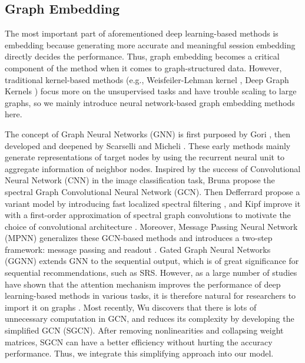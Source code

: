 \documentclass[conference]{IEEEtran}
\begin{document}
\subsection{Graph Embedding}
\noindent The most important part of aforementioned deep learning-based methods is embedding because generating more accurate and meaningful session embedding directly decides the performance. Thus, graph embedding becomes a critical component of the method when it comes to graph-structured data. However, traditional kernel-based methods (e.g., Weisfeiler-Lehman kernel \cite{shervashidze11}, Deep Graph Kernels \cite{Yanardag15}) focus more on the unsupervised tasks and have trouble scaling to large graphs, so we mainly introduce neural network-based graph embedding methods here. 

The concept of Graph Neural Networks (GNN) is first purposed by Gori  \cite{Gori05}, then developed and deepened by Scarselli  \cite{scarselli09} and Micheli  \cite{micheli09}. These early methods mainly generate representations of target nodes by using the recurrent neural unit to aggregate information of neighbor nodes. Inspired by the success of Convolutional Neural Network (CNN) in the image classification task, Bruna  \cite{Bruna14} propose the spectral Graph Convolutional Neural Network (GCN). Then Defferrard  propose a variant model by introducing fast localized spectral filtering \cite{Defferrard16}, and Kipf  improve it with a first-order approximation of spectral graph convolutions to motivate the choice of convolutional architecture \cite{Kipf16}. Moreover, Message Passing Neural Network (MPNN) generalizes these GCN-based methods and introduces a two-step framework: message passing and readout \cite{Gilmer17}. Gated Graph Neural Networks (GGNN) \cite{Li15} extends GNN to the sequential output, which is of great significance for sequential recommendations, such as SRS. However, as a large number of studies have shown that the attention mechanism improves the performance of deep learning-based methods in various tasks, it is therefore natural for researchers to import it on graphs \cite{Velickovic17,choi17}. Most recently, Wu  \cite{wu2019simplifying} discovers that there is lots of unnecessary computation in GCN, and reduces its complexity by developing the simplified GCN (SGCN). After removing nonlinearities and collapsing weight matrices, SGCN can have a better efficiency without hurting the accuracy performance. Thus, we integrate this simplifying approach into our model.
\end{document}
